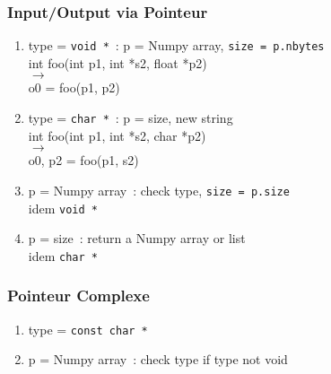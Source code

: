 \begin{frame}
  \frametitle{Input/Output via Pointeur}
  \begin{enumerate}
  \item type = \texttt{void *}~: p = Numpy array, \texttt{size = p.nbytes} \\
    int foo(int p1, int *s2, float *p2) \\
    $\longrightarrow$ \\
    o0 = foo(p1, p2)
  \item type = \texttt{char *}~: p = size, new string \\
    int foo(int p1, int *s2, char *p2) \\
    $\longrightarrow$ \\
    o0, p2 = foo(p1, s2)
  \item p = Numpy array~: check type, \texttt{size = p.size} \\
    idem \texttt{void *}
  \item p = size~: return a Numpy array or list \\
    idem \texttt{char *}
  \end{enumerate}
\end{frame}

\begin{frame}
  \frametitle{Pointeur Complexe}
  \begin{enumerate}
  \item type = \texttt{const char *}
  \item p = Numpy array~: check type if type not void
  \end{enumerate}
\end{frame}

